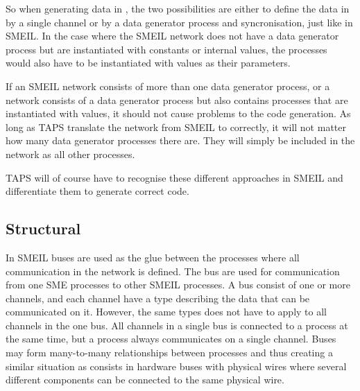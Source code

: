 So when generating data in \cspm{}, the two possibilities are either to define the data in \cspm by a single channel or by a data generator process and syncronisation, just like in SMEIL. In the case where the SMEIL network does not have a data generator process but are instantiated with constants or internal values, the \cspm processes would also have to be instantiated with values as their parameters.

If an SMEIL network consists of more than one data generator process, or a network consists of a data generator process but also contains processes that are instantiated with values, it should not cause problems to the \cspm{} code generation. As long as TAPS translate the network from SMEIL to \cspm{} correctly, it will not matter how many data generator processes there are. They will simply be included in the network as all other processes.

TAPS will of course have to recognise these different approaches in SMEIL and differentiate them to generate correct \cspm{} code.
\subsection{Structural}
\label{sec:analysis_structural}

In SMEIL buses are used as the glue between the processes where all communication in the network is defined. The bus are used for communication from one SME processes to other SMEIL processes. A bus consist of one or more channels, and each channel have a type describing the data that can be communicated on it. However, the same types does not have to apply to all channels in the one bus. All channels in a single bus is connected to a process at the same time, but a process always communicates on a single channel.
Buses may form many-to-many relationships between processes and thus creating a similar situation as consists in hardware buses with physical wires where several different components can be connected to the same physical wire.

